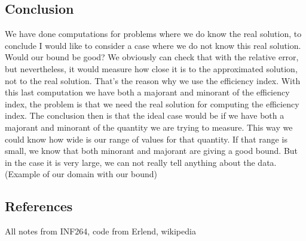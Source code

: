 \documentclass{article}
\begin{document}
    \subsection*{Conclusion}
    We have done computations for problems where we do know the real solution, to conclude I would like to consider a case where we do not know this real solution. Would our bound be good? We obviously can check that with the relative error, but nevertheless, it would measure how close it is to the approximated solution, not to the real solution. That's the reason why we use the efficiency index. With this last computation we have both a majorant and minorant of the efficiency index, the problem is that we need the real solution for computing the efficiency index. The conclusion then is that the ideal case would be if we have both a majorant and minorant of the quantity we are trying to measure. This way we could know how wide is our range of values for that quantity. If that range is small, we know that both minorant and majorant are giving a good bound. But in the case it is very large, we can not really tell anything about the data. (Example of our domain with our bound)
    \subsection*{References}
    All notes from INF264, code from Erlend, wikipedia
\end{document}
